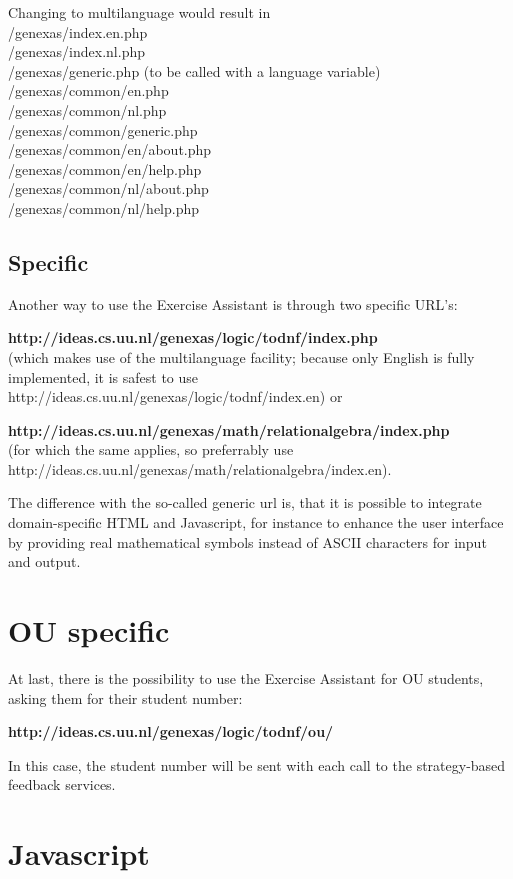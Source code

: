 \documentclass{article}
\begin{document}
Changing to multilanguage would result in\\
/genexas/index.en.php \\
/genexas/index.nl.php \\
/genexas/generic.php (to be called with a language variable)\\
/genexas/common/en.php \\
/genexas/common/nl.php \\
/genexas/common/generic.php \\
/genexas/common/en/about.php \\
/genexas/common/en/help.php \\
/genexas/common/nl/about.php \\
/genexas/common/nl/help.php \\

\subsection{Specific}
Another way to use the Exercise Assistant is through two specific URL's: 

\textbf{http://ideas.cs.uu.nl/genexas/logic/todnf/index.php} \\ (which makes use of the multilanguage facility; because only English is fully implemented, it is safest to use http://ideas.cs.uu.nl/genexas/logic/todnf/index.en) or 

\textbf{http://ideas.cs.uu.nl/genexas/math/relationalgebra/index.php} \\ (for which the same applies, so preferrably use http://ideas.cs.uu.nl/genexas/math/relationalgebra/index.en).

The difference with the so-called generic url is, that it is possible to integrate domain-specific HTML and Javascript, for instance to enhance the user interface by providing real mathematical symbols instead of ASCII characters for input and output.

\section{OU specific}
At last, there is the possibility to use the Exercise Assistant for OU students, asking them for their student number:

\textbf{http://ideas.cs.uu.nl/genexas/logic/todnf/ou/}

In this case, the student number will be sent with each call to the strategy-based feedback services.

\section{Javascript}
\end{document}
